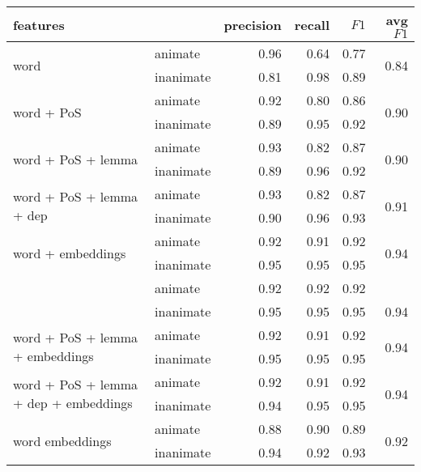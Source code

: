 \documentclass[a4paper,UKenglish]{oasics}
\begin{document}
\begin{table}
\centering
\begin{tabular}{llrrrr}
\toprule
features                                               &           & precision & recall & $F1$ & avg $F1$              \\ \midrule
\multirow{2}{*}{word}                                  & animate   & 0.96      & 0.64   & 0.77 & \multirow{2}{*}{0.84} \\
                                                       & inanimate & 0.81      & 0.98   & 0.89 &                       \\
\multirow{2}{*}{word + PoS}                            & animate   & 0.92      & 0.80   & 0.86 & \multirow{2}{*}{0.90} \\
                                                       & inanimate & 0.89      & 0.95   & 0.92 &                       \\
\multirow{2}{*}{word + PoS + lemma}                    & animate   & 0.93      & 0.82   & 0.87 & \multirow{2}{*}{0.90} \\
                                                       & inanimate & 0.89      & 0.96   & 0.92 &                       \\
\multirow{2}{*}{word + PoS + lemma + dep}              & animate   & 0.93      & 0.82   & 0.87 & \multirow{2}{*}{0.91} \\
                                                       & inanimate & 0.90      & 0.96   & 0.93 &                       \\
\multirow{2}{*}{word + embeddings}                     & animate   & 0.92      & 0.91   & 0.92 & \multirow{2}{*}{0.94} \\
                                                       & inanimate & 0.95      & 0.95   & 0.95 &                       \\
\rowcolor{Gray}                                        & animate   & 0.92      & 0.92   & 0.92 &                       \\
\rowcolor{Gray}\multirow{-2}{*}{word + PoS + embeddings} & inanimate & 0.95    & 0.95   & 0.95 & \multirow{-2}{*}{0.94}\\
\multirow{2}{*}{word + PoS + lemma + embeddings}       & animate   & 0.92      & 0.91   & 0.92 & \multirow{2}{*}{0.94} \\
                                                       & inanimate & 0.95      & 0.95   & 0.95 &                       \\
\multirow{2}{*}{word + PoS + lemma + dep + embeddings} & animate   & 0.92      & 0.91   & 0.92 & \multirow{2}{*}{0.94} \\
                                                       & inanimate & 0.94      & 0.95   & 0.95 &                       \\
\multirow{2}{*}{word embeddings}                       & animate   & 0.88      & 0.90   & 0.89 & \multirow{2}{*}{0.92} \\
                                                       & inanimate & 0.94      & 0.92   & 0.93 &                       \\


\end{tabular}
\end{table}
\end{document}
